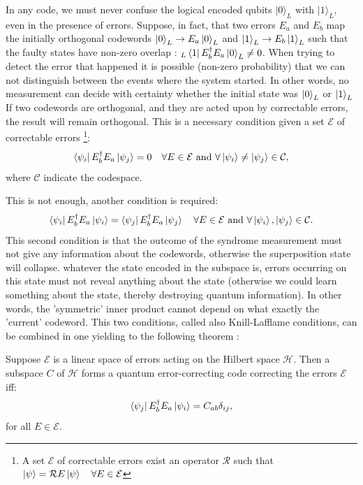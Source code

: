 In any code, we must never confuse the logical encoded qubits $|0\rangle_L$ with $|1\rangle_L$, even in the presence of errors.
Suppose, in fact, that two errors $E_a$ and $E_b$ map the initially orthogonal codewords $\ket{0}_L \to E_a\ket{0}_L$ and $\ket{1}_L \to E_b \ket{1}_L$ such that the faulty states have non-zero overlap : $_L\bra{1}E_b^{\dagger}E_a\ket{0}_L \neq 0$. 
When trying to detect the error that happened it is possible (non-zero probability) that we can not distinguish between the events where the system started. In other words, no measurement can decide with certainty whether the initial state was $\ket{0}_L$ or $\ket{1}_L$
If two codewords are orthogonal, and they are acted upon by correctable errors, the result will remain orthogonal. This is a necessary condition given a set $\mathcal{E}$ of correctable errors \footnote{A set $\mathcal{E}$ of correctable errors exist an operator $\mathcal{R}$ such that $\ket{\psi} = \mathcal{R}E\ket{\psi} \quad \forall E \in \mathcal{E}$}:
\begin{equation*}
    \bra{\psi_i}E_b^{\dagger}E_a\ket{\psi_j} = 0 \quad \forall E \in \mathcal{E} \text{   and   } \forall \ket{\psi_i} \neq \ket{\psi_j} \in \mathcal{C},
\end{equation*}
where $\mathcal{C}$ indicate the codespace.

This is not enough, another condition is required:
\begin{equation*}
    \bra{\psi_i}E_b^{\dagger}E_a\ket{\psi_i} = \bra{\psi_j}E_b^{\dagger}E_a\ket{\psi_j} \quad \forall E \in \mathcal{E} \text{   and   } \forall \ket{\psi_i},\ket{\psi_j} \in \mathcal{C}.
\end{equation*}
This second condition is that the outcome of the syndrome measurement must not give any information about the codewords, otherwise the superposition state will collapse. 
whatever the state encoded in the subspace is, errors occurring on this state must not reveal anything about the state (otherwise we could learn something about the state, thereby destroying quantum information). In other words, the 'symmetric' inner product cannot depend on what exactly the 'current' codeword.
This two conditions, called also Knill-Lafflame conditions, can be combined in one yielding to the following theorem \cite{Knill_2000}: 
 \begin{theorem}
 Suppose $\mathcal{E}$ is a linear space of errors acting on the Hilbert space
$\mathcal{H}$. Then a subspace $C$ of $\mathcal{H}$ forms a quantum error-correcting code correcting the errors $\mathcal{E}$ iff:
\begin{equation}
\bra{\psi_j}E_b^{\dagger}E_a\ket{\psi_i} = C_{a b}\delta_{ij},
\label{eq:conderrorcorrect}
\end{equation}
for all $E \in \mathcal{E}$. 
\end{theorem}

